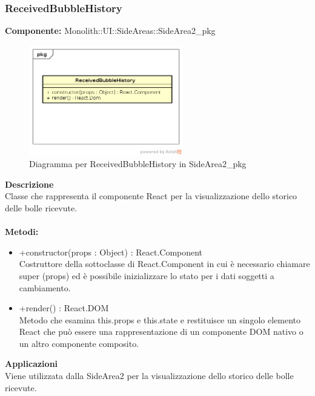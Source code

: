 \subsubsection{ReceivedBubbleHistory}
\textbf{Componente:}  Monolith::UI::SideAreas::SideArea2\_pkg\\
   \FloatBarrier
   \begin{figure}[ht]
   \centering
   \includegraphics[width=0.6\textwidth]{img/single-ReceivedBubbleHistory}
   \caption{{Diagramma per ReceivedBubbleHistory in SideArea2\_pkg}}
\end{figure}
\FloatBarrier
\textbf{Descrizione}\\
Classe che rappresenta il componente React per la visualizzazione dello storico delle bolle ricevute. \\\\
\textbf{Metodi:} \begin{itemize}\item +constructor(props : Object) : React.Component \\Costruttore della sottoclasse di React.Component in cui è necessario chiamare super (props) ed è possibile inizializzare lo stato per i dati soggetti a cambiamento.\item +render() : React.DOM \\Metodo che esamina this.props e this.state e restituisce un singolo elemento React che può essere una rappresentazione di un componente DOM nativo o un altro componente composito.\end{itemize} 


\textbf{Applicazioni}\\
Viene utilizzata dalla SideArea2 per la visualizzazione dello storico delle bolle ricevute. 


\clearpage

